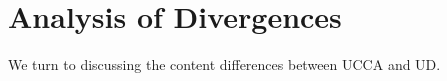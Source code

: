 \documentclass[11pt,a4paper]{article}
\begin{document}




\section{Analysis of Divergences}\label{sec:analysis}

We turn to discussing the content differences between UCCA and UD.
\end{document}
